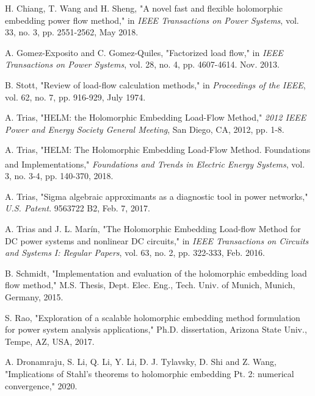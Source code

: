 \documentclass[journal]{IEEEtran}
\begin{document}
\begin{thebibliography}{22}


H. Chiang, T. Wang and H. Sheng, "A novel fast and flexible holomorphic embedding power flow method," in \emph{IEEE Transactions on Power Systems}, vol. 33, no. 3, pp. 2551-2562, May 2018.

A. Gomez-Exposito and C. Gomez-Quiles, "Factorized load flow," in \emph{IEEE Transactions on Power Systems}, vol. 28, no. 4, pp. 4607-4614. Nov. 2013.

B. Stott, "Review of load-flow calculation methods," in \emph{Proceedings of the IEEE}, vol. 62, no. 7, pp. 916-929, July 1974. 

A. Trias, "HELM: the Holomorphic Embedding Load-Flow Method," \emph{2012 IEEE Power and Energy Society General Meeting}, San Diego, CA, 2012, pp. 1-8.

A. Trias, "HELM: The Holomorphic Embedding Load-Flow Method. Foundations and Implementations," \emph{Foundations and Trends\textsuperscript{\textregistered} in Electric Energy Systems}, vol. 3, no. 3-4, pp. 140-370, 2018.

A. Trias, "Sigma algebraic approximants as a diagnostic tool in power networks," \emph{U.S. Patent}. 9563722 B2, Feb. 7, 2017.

A. Trias and J. L. Marín, "The Holomorphic Embedding Load-flow Method for DC power systems and nonlinear DC circuits," in \emph{IEEE Transactions on Circuits and Systems I: Regular Papers}, vol. 63, no. 2, pp. 322-333, Feb. 2016.

B. Schmidt, "Implementation and evaluation of the holomorphic embedding load flow method," M.S. Thesis, Dept. Elec. Eng., Tech. Univ. of Munich, Munich, Germany, 2015.


S. Rao, "Exploration of a scalable holomorphic embedding method formulation for power system analysis applications," Ph.D. dissertation, Arizona State Univ., Tempe, AZ, USA, 2017.

A. Dronamraju, S. Li, Q. Li, Y. Li, D. J. Tylavsky, D. Shi and Z. Wang, "Implications of Stahl's theorems to holomorphic embedding Pt. 2: numerical convergence," 2020.


\end{thebibliography}
\end{document}
